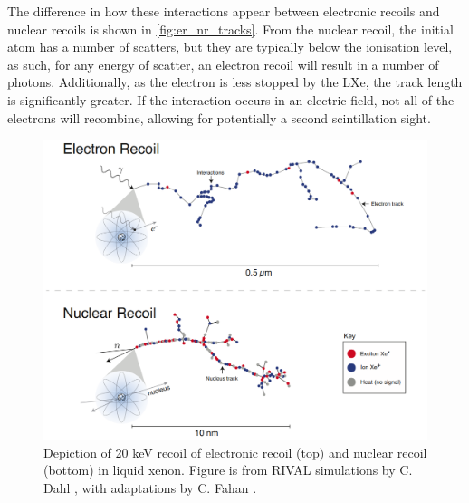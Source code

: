 \par
The difference in how these interactions appear between electronic recoils and nuclear recoils is shown in \autoref{fig:er_nr_tracks}.
From the nuclear recoil, the initial atom has a number of scatters, but they are typically below the ionisation level, as such, for any energy of scatter, an electron recoil will result in a number of photons.
Additionally, as the electron is less stopped by the LXe, the track length is significantly greater.
If the interaction occurs in an electric field, not all of the electrons will recombine, allowing for potentially a second scintillation sight.

\begin{figure}
    \centering
    \includegraphics[width=\textwidth]{Figures/LZ/er_nr_tracks.png}
    \caption[Depiction of a 20keV recoil on liquid xenon]{Depiction of 20 keV recoil of electronic recoil (top) and nuclear recoil (bottom) in liquid xenon.
    Figure is from RIVAL simulations by C. Dahl \cite{carldahl_thesis_ref}, with adaptations by C. Fahan \cite{carlosfahan_thesis_ref}.}
    \label{fig:er_nr_tracks}
\end{figure}

